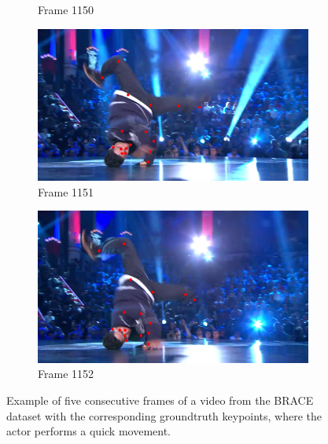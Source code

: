 \documentclass[./main.tex]{subfiles}
\begin{document}
\begin{figure}[htbp]
\begin{subfigure}{0.45\textwidth}
        \caption{Frame 1150}
    \end{subfigure}
    \begin{subfigure}{0.45\textwidth}
        \centering
        \includegraphics[width=\textwidth]{entities/BRACE_1151.png}
        \caption{Frame 1151}
    \end{subfigure}
    \begin{subfigure}{0.45\textwidth}
        \centering
        \includegraphics[width=\textwidth]{entities/BRACE_1152.png}
        \caption{Frame 1152}
    \end{subfigure}
    \caption{Example of five consecutive frames of a video from the BRACE dataset with the corresponding groundtruth keypoints, where the actor performs a quick movement.}
    \label{fig:BRACE_dataset_quick}
\end{figure}
\end{document}
